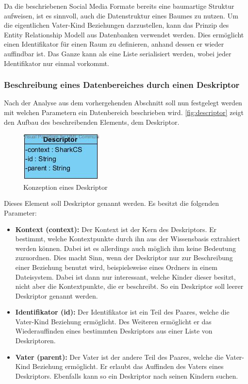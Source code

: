 \documentclass[a4paper]{article}
\begin{document}
	Da die beschriebenen Social Media Formate bereits eine baumartige Struktur
	aufweisen, ist es sinnvoll, auch die Datenstruktur eines Baumes zu nutzen. Um
	die eigentlichen Vater-Kind Beziehungen darzustellen, kann das Prinzip des
	Entity Relationship Modell aus Datenbanken verwendet werden. Dies ermöglicht
	einen Identifikator für einen Raum zu definieren, anhand dessen er wieder
	auffindbar ist. Das Ganze kann als eine Liste serialisiert werden, wobei
	jeder Identifikator nur einmal vorkommt.
	
	\subsubsection{Beschreibung eines Datenbereiches durch einen Deskriptor}
	\label{sec:desk}
	
	Nach der Analyse aus dem vorhergehenden Abschnitt soll nun festgelegt werden
	mit welchen Parametern ein Datenbereich beschrieben wird.
	\autoref{fig:descriptor} zeigt den Aufbau des beschreibenden Elements, dem
	Deskriptor.
	
	\begin{figure}[H] 
		\centerline{
			\includegraphics{../Bilder/descriptor.jpg}
		}
		\caption{Konzeption eines Deskriptor}
		\label{fig:descriptor}
	\end{figure}
	
	Dieses Element soll Deskriptor genannt werden. Es besitzt die folgenden
	Parameter:
	
	\begin{itemize}
		\item \textbf{Kontext (context):} Der Kontext ist der Kern des Deskriptors.
		Er bestimmt, welche Kontextpunkte durch ihn aus der Wissensbasis extrahiert
		werden können. Dabei ist es allerdings auch möglich ihm keine Bedeutung 
		zuzuordnen. Dies macht Sinn, wenn der Deskriptor nur zur Beschreibung einer
		Beziehung benutzt wird, beispielsweise eines Ordners in einem Dateisystem.
		Dabei ist dann nur interessant, welche Kinder dieser besitzt, nicht aber
		die Kontextpunkte, die er beschreibt. So ein Deskriptor soll leerer
		Deskriptor genannt werden.
		\item \textbf{Identifikator (id):} Der Identifikator ist ein Teil des
		Paares, welche die Vater-Kind Beziehung ermöglicht. Des Weiteren
		ermöglicht er das Wiederauffinden eines bestimmten Deskriptors aus einer
		Liste von Deskriptoren.
		\item \textbf{Vater (parent):} Der Vater ist der andere Teil des Paares,
		welche die Vater-Kind Beziehung ermöglicht. Er erlaubt das Auffinden des
		Vaters eines Deskriptors. Ebenfalls kann so ein Deskriptor nach seinen
		Kindern	suchen.
	\end{itemize} 	
	
\end{document}
